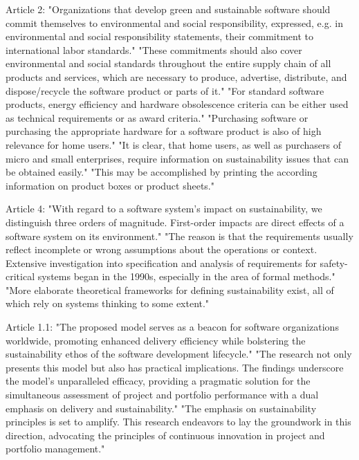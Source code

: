 \begin{itemize}
Article 2:
"Organizations that develop green and sustainable software should commit themselves to environmental and social responsibility, expressed, e.g. in environmental and social responsibility statements, their commitment to international labor standards."
"These commitments should also cover environmental and social standards throughout the entire supply chain of all products and services, which are necessary to produce, advertise, distribute, and dispose/recycle the software product or parts of it."
"For standard software products, energy efficiency and hardware obsolescence criteria can be either used as technical requirements or as award criteria."
"Purchasing software or purchasing the appropriate hardware for a software product is also of high relevance for home users."
"It is clear, that home users, as well as purchasers of micro and small enterprises, require information on sustainability issues that can be obtained easily."
"This may be accomplished by printing the according information on product boxes or product sheets."

Article 4:
"With regard to a software system’s impact on sustainability, we distinguish three orders of magnitude. First-order impacts are direct effects of a software system on its environment." 
"The reason is that the requirements usually reflect incomplete or wrong assumptions about the operations or context. Extensive investigation into specification and analysis of requirements for safety-critical systems began in the 1990s, especially in the area of formal methods." 
"More elaborate theoretical frameworks for defining sustainability exist, all of which rely on systems thinking to some extent." 

Article 1.1:
"The proposed model serves as a beacon for software organizations worldwide, promoting enhanced delivery efficiency while bolstering the sustainability ethos of the software development lifecycle." 
"The research not only presents this model but also has practical implications. The findings underscore the model’s unparalleled efficacy, providing a pragmatic solution for the simultaneous assessment of project and portfolio performance with a dual emphasis on delivery and sustainability."
"The emphasis on sustainability principles is set to amplify. This research endeavors to lay the groundwork in this direction, advocating the principles of continuous innovation in project and portfolio management." 


\end{itemize}
